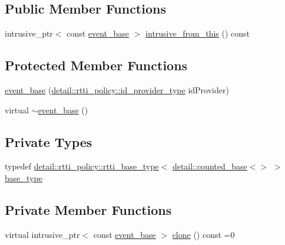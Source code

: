 \subsection*{Public Member Functions}
\begin{DoxyCompactItemize}
\item 
intrusive\+\_\+ptr$<$ const \mbox{\hyperlink{classboost_1_1statechart_1_1event__base}{event\+\_\+base}} $>$ \mbox{\hyperlink{classboost_1_1statechart_1_1event__base_a3876893500a8f7739e39dd4d924bae09}{intrusive\+\_\+from\+\_\+this}} () const
\end{DoxyCompactItemize}
\subsection*{Protected Member Functions}
\begin{DoxyCompactItemize}
\item 
\mbox{\hyperlink{classboost_1_1statechart_1_1event__base_af6214681a50f4ee80d54dfe43d478d4b}{event\+\_\+base}} (\mbox{\hyperlink{structboost_1_1statechart_1_1detail_1_1rtti__policy_afd9bc153e4b739bd085ea646f21c3cba}{detail\+::rtti\+\_\+policy\+::id\+\_\+provider\+\_\+type}} id\+Provider)
\item 
virtual \mbox{\hyperlink{classboost_1_1statechart_1_1event__base_a140c3bb51e5409101970b4c7d299e4e8}{$\sim$event\+\_\+base}} ()
\end{DoxyCompactItemize}
\subsection*{Private Types}
\begin{DoxyCompactItemize}
\item 
typedef \mbox{\hyperlink{classboost_1_1statechart_1_1detail_1_1rtti__policy_1_1rtti__base__type}{detail\+::rtti\+\_\+policy\+::rtti\+\_\+base\+\_\+type}}$<$ \mbox{\hyperlink{classboost_1_1statechart_1_1detail_1_1counted__base}{detail\+::counted\+\_\+base}}$<$$>$ $>$ \mbox{\hyperlink{classboost_1_1statechart_1_1event__base_a61d8032630b4713b360b5612ee1c919f}{base\+\_\+type}}
\end{DoxyCompactItemize}
\subsection*{Private Member Functions}
\begin{DoxyCompactItemize}
\item 
virtual intrusive\+\_\+ptr$<$ const \mbox{\hyperlink{classboost_1_1statechart_1_1event__base}{event\+\_\+base}} $>$ \mbox{\hyperlink{classboost_1_1statechart_1_1event__base_a72e40beb11e594199e6d4d62ae6c57d3}{clone}} () const =0
\end{DoxyCompactItemize}
